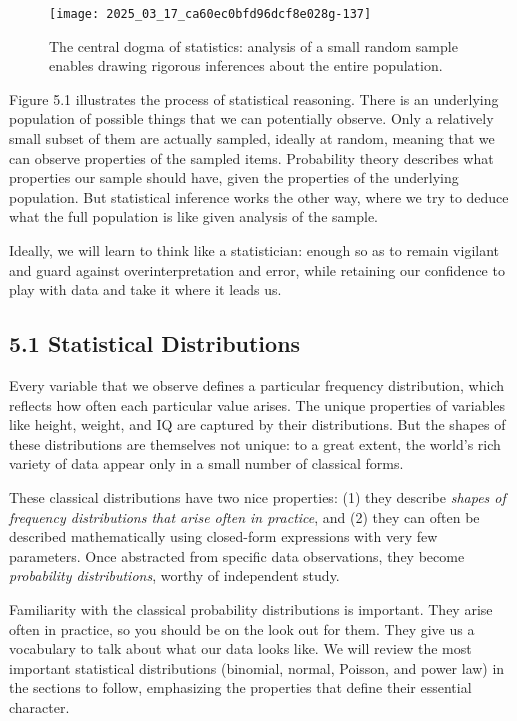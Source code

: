 \documentclass[10pt]{article}
\begin{document}
\begin{figure}[h]
\centering
\texttt{[image: 2025\_03\_17\_ca60ec0bfd96dcf8e028g-137]}
\caption{The central dogma of statistics: analysis of a small random sample enables drawing rigorous inferences about the entire population.}
\end{figure} 

Figure 5.1 illustrates the process of statistical reasoning. There is an underlying population of possible things that we can potentially observe. Only a relatively small subset of them are actually sampled, ideally at random, meaning that we can observe properties of the sampled items. Probability theory describes what properties our sample should have, given the properties of the underlying population. But statistical inference works the other way, where we try to deduce what the full population is like given analysis of the sample.

Ideally, we will learn to think like a statistician: enough so as to remain vigilant and guard against overinterpretation and error, while retaining our confidence to play with data and take it where it leads us.

\subsection*{5.1 Statistical Distributions}
Every variable that we observe defines a particular frequency distribution, which reflects how often each particular value arises. The unique properties of variables like height, weight, and IQ are captured by their distributions. But the shapes of these distributions are themselves not unique: to a great extent, the world's rich variety of data appear only in a small number of classical forms.

These classical distributions have two nice properties: (1) they describe \emph{shapes of frequency distributions that arise often in practice}, and (2) they can often be described mathematically using closed-form expressions with very few parameters. Once abstracted from specific data observations, they become \emph{probability distributions}, worthy of independent study.

Familiarity with the classical probability distributions is important. They arise often in practice, so you should be on the look out for them. They give us a vocabulary to talk about what our data looks like. We will review the most important statistical distributions (binomial, normal, Poisson, and power law) in the sections to follow, emphasizing the properties that define their essential character.
\end{document}
